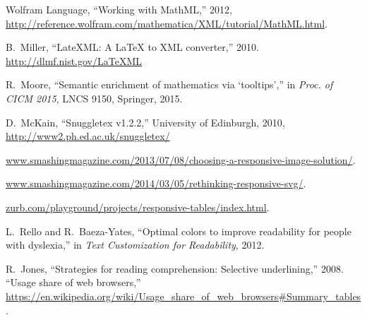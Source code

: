 \documentclass[conference]{IEEEtran}
\begin{document}
\begin{thebibliography}{10}
{Wolfram Language}, ``Working with {MathML},'' 2012,
  \url{http://reference.wolfram.com/mathematica/XML/tutorial/MathML.html}.

 B.~Miller, ``LateXML: A LaTeX to XML converter,'' 2010.
\url{http://dlmf.nist.gov/LaTeXML}

\BIBentryALTinterwordspacing
R.~Moore, ``{Semantic enrichment of mathematics via
  `tooltips'},'' in \emph{Proc. of CICM 2015}, LNCS 9150, Springer, 2015.
\BIBentrySTDinterwordspacing

D.~McKain, ``Snuggletex v1.2.2,'' University of Edinburgh, 2010,
  \url{http://www2.ph.ed.ac.uk/snuggletex/}

\url{www.smashingmagazine.com/2013/07/08/choosing-a-responsive-image-solution/}.

\url{www.smashingmagazine.com/2014/03/05/rethinking-responsive-svg/}.

\url{zurb.com/playground/projects/responsive-tables/index.html}.

L.~Rello and R.~Baeza-Yates, ``Optimal colors to improve readability for people
  with dyslexia,'' in \emph{Text Customization for Readability}, 2012.

R.~Jones, ``Strategies for reading comprehension: Selective underlining,''
  2008.
``Usage share of web browsers,'' \url{https://en.wikipedia.org/wiki/Usage_share_of_web_browsers#Summary_tables}.
\end{thebibliography}
\end{document}
